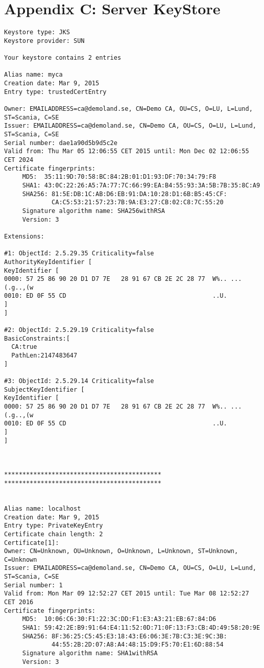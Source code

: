 \documentclass[11pt,a4paper]{article}
\begin{document}
\section{Appendix C: Server KeyStore}
\begin{verbatim}
Keystore type: JKS
Keystore provider: SUN

Your keystore contains 2 entries

Alias name: myca
Creation date: Mar 9, 2015
Entry type: trustedCertEntry

Owner: EMAILADDRESS=ca@demoland.se, CN=Demo CA, OU=CS, O=LU, L=Lund, ST=Scania, C=SE
Issuer: EMAILADDRESS=ca@demoland.se, CN=Demo CA, OU=CS, O=LU, L=Lund, ST=Scania, C=SE
Serial number: dae1a90d5b9d5c2e
Valid from: Thu Mar 05 12:06:55 CET 2015 until: Mon Dec 02 12:06:55 CET 2024
Certificate fingerprints:
	 MD5:  35:11:9D:70:58:BC:84:2B:01:D1:93:DF:70:34:79:F8
	 SHA1: 43:0C:22:26:A5:7A:77:7C:66:99:EA:B4:55:93:3A:5B:7B:35:8C:A9
	 SHA256: 81:5E:DB:1C:AB:D6:EB:91:DA:10:28:D1:6B:B5:45:CF:
	         CA:C5:53:21:57:23:7B:9A:E3:27:CB:02:C8:7C:55:20
	 Signature algorithm name: SHA256withRSA
	 Version: 3

Extensions: 

#1: ObjectId: 2.5.29.35 Criticality=false
AuthorityKeyIdentifier [
KeyIdentifier [
0000: 57 25 86 90 20 D1 D7 7E   28 91 67 CB 2E 2C 28 77  W%.. ...(.g..,(w
0010: ED 0F 55 CD                                        ..U.
]
]

#2: ObjectId: 2.5.29.19 Criticality=false
BasicConstraints:[
  CA:true
  PathLen:2147483647
]

#3: ObjectId: 2.5.29.14 Criticality=false
SubjectKeyIdentifier [
KeyIdentifier [
0000: 57 25 86 90 20 D1 D7 7E   28 91 67 CB 2E 2C 28 77  W%.. ...(.g..,(w
0010: ED 0F 55 CD                                        ..U.
]
]



*******************************************
*******************************************


Alias name: localhost
Creation date: Mar 9, 2015
Entry type: PrivateKeyEntry
Certificate chain length: 2
Certificate[1]:
Owner: CN=Unknown, OU=Unknown, O=Unknown, L=Unknown, ST=Unknown, C=Unknown
Issuer: EMAILADDRESS=ca@demoland.se, CN=Demo CA, OU=CS, O=LU, L=Lund, ST=Scania, C=SE
Serial number: 1
Valid from: Mon Mar 09 12:52:27 CET 2015 until: Tue Mar 08 12:52:27 CET 2016
Certificate fingerprints:
	 MD5:  10:06:C6:30:F1:22:3C:DD:F1:E3:A3:21:EB:67:84:D6
	 SHA1: 59:42:2E:B9:91:64:E4:11:52:0D:71:0F:13:F3:CB:4D:49:58:20:9E
	 SHA256: 8F:36:25:C5:45:E3:18:43:E6:06:3E:7B:C3:3E:9C:3B:
	         44:55:2B:2D:07:A8:A4:48:15:D9:F5:70:E1:6D:88:54
	 Signature algorithm name: SHA1withRSA
	 Version: 3


\end{verbatim}
\end{document}

